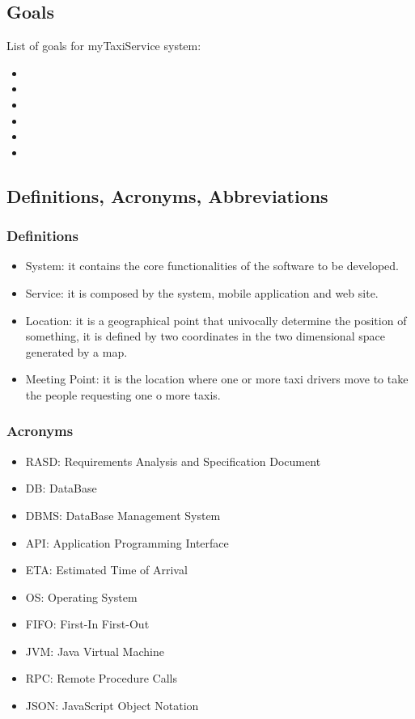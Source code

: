 \documentclass[a4paper,12pt]{article}%
\begin{document}
\subsection{Goals}
List of goals for myTaxiService system:
\begin{itemize}
\item {}
\item {}
\item {}
\item {}
\item {}
\item {}
\end{itemize}
\subsection{Definitions, Acronyms, Abbreviations}
\subsubsection{Definitions}
\begin{itemize}
\item System: it contains the core functionalities of the software to be developed.
\item Service: it is composed by the system, mobile application and web site.
\item Location: it is a geographical point that univocally determine the position of something, it is defined by two coordinates in the two dimensional space generated by a map.
\item Meeting Point: it is the location where one or more taxi drivers move to take the people requesting one o more taxis.
\end{itemize}
\subsubsection{Acronyms}
\begin{itemize}
\item RASD: Requirements Analysis and Specification Document
\item DB: DataBase
\item DBMS: DataBase Management System
\item API: Application Programming Interface
\item ETA: Estimated Time of Arrival
\item OS: Operating System
\item FIFO: First-In First-Out
\item JVM: Java Virtual Machine
\item RPC: Remote Procedure Calls
\item JSON: JavaScript Object Notation
\end{itemize}
\end{document}
